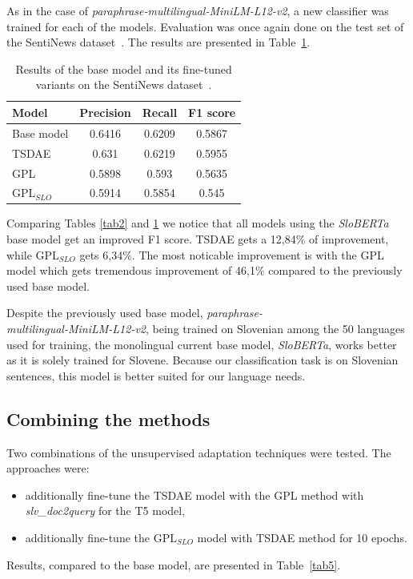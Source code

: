 \documentclass[fleqn,moreauthors,10pt]{ds_report}
\begin{document}
As in the case of {\it paraphrase-multilingual-MiniLM-L12-v2}, a new classifier was trained for each of the models. Evaluation was once again done on the test set of the SentiNews dataset~\cite{sentiNews}. The results are presented in Table~\ref{tab4}.

\begin{table}[!h]
	\footnotesize
	\begin{center}
		\begin{tabular}{ |l|c|c|c| }
		\hline
		\rowcolor{Blue}Model & Precision & Recall & F1 score\\
		\hline

		Base model & 0.6416 & 0.6209 & 0.5867\\
		\hline
		TSDAE & 0.631 & 0.6219 & 0.5955\\
		\hline
		GPL & 0.5898 & 0.593 & 0.5635\\
		$\text{GPL}_{SLO}$ & 0.5914 & 0.5854 & 0.545\\

		\hline
		\end{tabular}
	\end{center}
\caption{Results of the base model and its fine-tuned variants on the SentiNews dataset~\cite{sentiNews}.}
\label{tab4}
\end{table}

Comparing Tables \ref*{tab2} and \ref*{tab4} we notice that all models using the {\it SloBERTa} base model get an
improved F1 score. TSDAE gets a 12,84\% of improvement, while $\text{GPL}_{SLO}$ gets 6,34\%.
The most noticable improvement is with the GPL model which gets tremendous improvement of 46,1\% compared to the previously used
base model.

Despite the previously used base model, {\it paraphrase-\\multilingual-MiniLM-L12-v2}, being trained on Slovenian among the 50 languages used
for training, the monolingual current base model, {\it SloBERTa}, works better as it is solely trained for Slovene.
Because our classification task is on Slovenian sentences, this model is better suited for our language needs.


\subsection*{Combining the methods}
Two combinations of the unsupervised adaptation techniques were tested. The approaches were:
\begin{itemize}
	\item additionally fine-tune the TSDAE model with the GPL method with {\it slv\_doc2query} for the T5 model,
	\item additionally fine-tune the $\text{GPL}_{SLO}$ model with TSDAE method for 10 epochs.
\end{itemize}
Results, compared to the base model, are presented in Table~\ref{tab5}.
\end{document}
